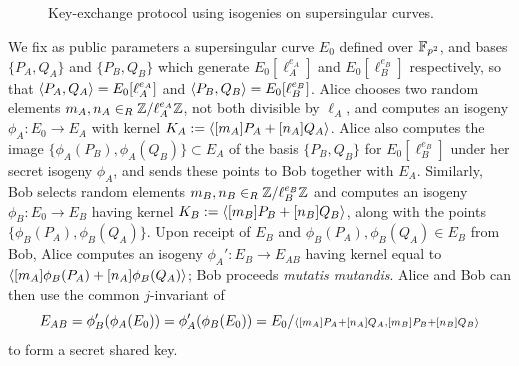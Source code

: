 \begin{figure}[t]
\begin{center}
\end{center}
\caption{Key-exchange protocol using isogenies on supersingular
  curves.}
\label{fig:kep}
\end{figure}

We fix as public parameters a supersingular curve $E_0$ defined over
${\mathbb{F}}_{p^2}$, and bases $\{P_{A},Q_{A}\}$ and $\{P_{B},Q_{B}\}$ which
generate $E_0[\ell_A^{e_A}]$ and $E_0[\ell_B^{e_B}]$ respectively, so
that ${\langle P_{A}, Q_{A} \rangle} = E_0[\ell_A^{e_A}]$ and ${\langle P_{B}, Q_{B} \rangle}
= E_0[\ell_B^{e_B}]$.  Alice chooses two random elements $m_A,n_A
\in_R {\mathbb{Z}}/\ell_A^{e_A}{\mathbb{Z}}$, not both divisible by $\ell_A$, and computes
an isogeny $\phi_A\colon E_0 \to E_A$ with kernel $K_A :=
{\langle [m_A]P_A+[n_A]Q_A \rangle}$. Alice also computes the image
$\{\phi_A(P_B), \phi_A(Q_B)\} \subset E_A$ of the basis
$\{P_{B},Q_{B}\}$ for $E_0[\ell_B^{e_B}]$ under her secret isogeny
$\phi_A$, and sends these points to Bob together with
$E_A$. Similarly, Bob selects random elements $m_B,n_B \in_R
{\mathbb{Z}}/\ell_B^{e_B}{\mathbb{Z}}$ and computes an isogeny $\phi_B\colon E_0 \to E_B$
having kernel $K_B := {\langle [m_B]P_B+[n_B]Q_B \rangle}$, along with the points
$\{\phi_B(P_A), \phi_B(Q_A)\}$. Upon receipt of $E_B$
and $\phi_B(P_A),\phi_B(Q_A) \in E_B$ from Bob, Alice computes an
isogeny $\phi_A' \colon E_B \to E_{AB}$ having kernel equal to
${\langle [m_A]\phi_B(P_A)+[n_A]\phi_B(Q_A) \rangle}$; Bob proceeds \emph{mutatis
mutandis}.  Alice and Bob can then use the common $j$-invariant of
\[ E_{AB} = \phi_B'(\phi_A(E_0))=  \phi_A'(\phi_B(E_0)) =
E_0/\scriptstyle{{\langle [m_A]P_A+[n_A]Q_A ,[m_B]P_B+[n_B]Q_B  \rangle}} \]
to form a secret shared key.

